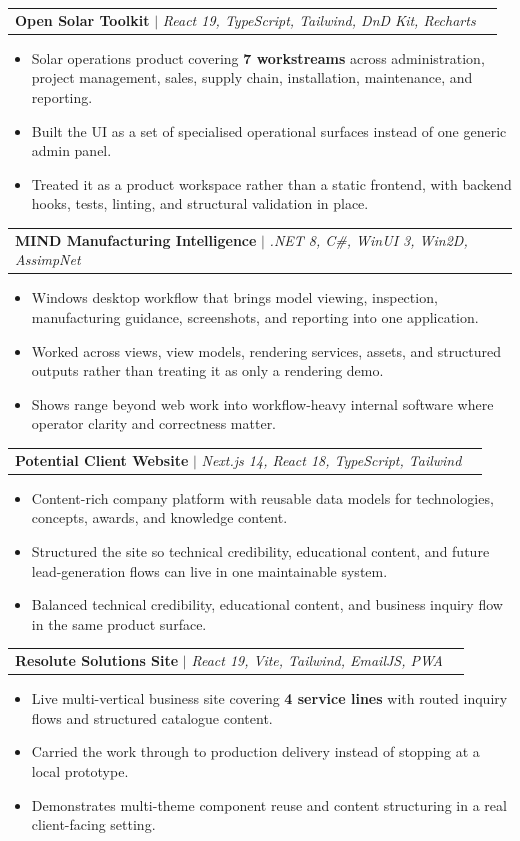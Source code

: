 \documentclass[letterpaper,11pt]{article}
\makeatletter
\newcommand{\resumeItem}[1]{\item\small{{#1 \vspace{-2pt}}}}
\newcommand{\resumeProjectHeading}[2]{
    \item
    \begin{tabular*}{1.001\textwidth}{l@{\extracolsep{\fill}}r}
      \small#1 & \textbf{\small #2}\\
    \end{tabular*}\vspace{-6pt}
}
\newcommand{\resumeItemListStart}{\begin{itemize}[leftmargin=0.15in]}
\newcommand{\resumeItemListEnd}{\end{itemize}\vspace{-5pt}}
\makeatother
\begin{document}
  \resumeProjectHeading
    {\textbf{Open Solar Toolkit} $|$ \emph{React 19, TypeScript, Tailwind, DnD Kit, Recharts}}{}
    \resumeItemListStart
      \resumeItem{Solar operations product covering \textbf{7 workstreams} across administration, project management, sales, supply chain, installation, maintenance, and reporting.}
      \resumeItem{Built the UI as a set of specialised operational surfaces instead of one generic admin panel.}
      \resumeItem{Treated it as a product workspace rather than a static frontend, with backend hooks, tests, linting, and structural validation in place.}
    \resumeItemListEnd
    \vspace{-10pt}

  \resumeProjectHeading
    {\textbf{MIND Manufacturing Intelligence} $|$ \emph{.NET 8, C\#, WinUI 3, Win2D, AssimpNet}}{}
    \resumeItemListStart
      \resumeItem{Windows desktop workflow that brings model viewing, inspection, manufacturing guidance, screenshots, and reporting into one application.}
      \resumeItem{Worked across views, view models, rendering services, assets, and structured outputs rather than treating it as only a rendering demo.}
      \resumeItem{Shows range beyond web work into workflow-heavy internal software where operator clarity and correctness matter.}
    \resumeItemListEnd
    \vspace{-10pt}

  \resumeProjectHeading
    {\textbf{Potential Client Website} $|$ \emph{Next.js 14, React 18, TypeScript, Tailwind}}{}
    \resumeItemListStart
      \resumeItem{Content-rich company platform with reusable data models for technologies, concepts, awards, and knowledge content.}
      \resumeItem{Structured the site so technical credibility, educational content, and future lead-generation flows can live in one maintainable system.}
      \resumeItem{Balanced technical credibility, educational content, and business inquiry flow in the same product surface.}
    \resumeItemListEnd
    \vspace{-10pt}

  \resumeProjectHeading
    {\textbf{Resolute Solutions Site} $|$ \emph{React 19, Vite, Tailwind, EmailJS, PWA}}{}
    \resumeItemListStart
      \resumeItem{Live multi-vertical business site covering \textbf{4 service lines} with routed inquiry flows and structured catalogue content.}
      \resumeItem{Carried the work through to production delivery instead of stopping at a local prototype.}
      \resumeItem{Demonstrates multi-theme component reuse and content structuring in a real client-facing setting.}
    \resumeItemListEnd
    \vspace{-10pt}
\end{document}
